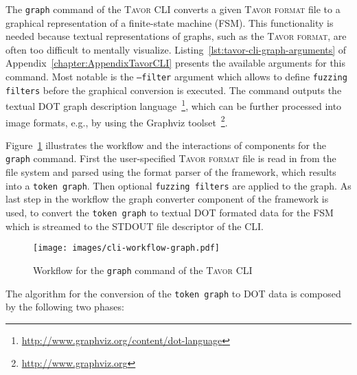 The \texttt{graph} command of the \textsc{Tavor CLI} converts a given \textsc{Tavor format} file to a graphical representation of a finite-state machine (FSM). This functionality is needed because textual representations of graphs, such as the \textsc{Tavor format}, are often too difficult to mentally visualize. Listing~\ref{lst:tavor-cli-graph-arguments} of Appendix~\ref{chapter:AppendixTavorCLI} presents the available arguments for this command. Most notable is the \texttt{---filter} argument which allows to define \texttt{fuzzing filters} before the graphical conversion is executed. The command outputs the textual DOT graph description language~\footnote{\url{http://www.graphviz.org/content/dot-language}}, which can be further processed into image formats, e.g., by using the Graphviz toolset~\footnote{\url{http://www.graphviz.org}}.

Figure~\ref{fig:cli-workflow-graph} illustrates the workflow and the interactions of components for the \texttt{graph} command. First the user-specified \textsc{Tavor format} file is read in from the file system and parsed using the format parser of the framework, which results into a \texttt{token graph}. Then optional \texttt{fuzzing filters} are applied to the graph. As last step in the workflow the graph converter component of the framework is used, to convert the \texttt{token graph} to textual DOT formated data for the FSM which is streamed to the STDOUT file descriptor of the CLI.

\begin{figure}[t]
\texttt{[image: images/cli-workflow-graph.pdf]}
\caption{Workflow for the \texttt{graph} command of the \textsc{Tavor CLI}}
\label{fig:cli-workflow-graph}
\end{figure}

The algorithm for the conversion of the \texttt{token graph} to DOT data is composed by the following two phases:

